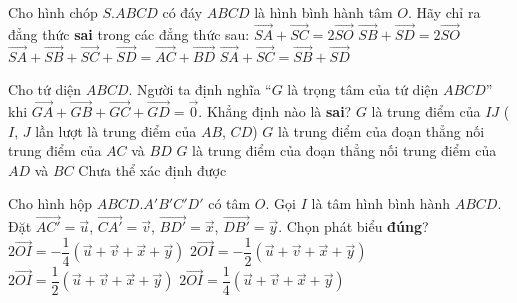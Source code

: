 \begin{ex}%
	Cho hình chóp $S.ABCD$ có đáy $ABCD$ là hình bình hành tâm $O$. Hãy chỉ ra đẳng thức \textbf{sai} trong các đẳng thức sau:
	\choice
	{$\vec{SA}+\vec{SC}=2\vec{SO}$}
	{$\vec{SB}+\vec{SD}=2\vec{SO}$}
	{\True $\vec{SA}+\vec{SB}+\vec{SC}+\vec{SD}=\vec{AC}+\vec{BD}$}
	{$\vec{SA}+\vec{SC}=\vec{SB}+\vec{SD}$}
\end{ex}

\begin{ex}%
	Cho tứ diện $ABCD$. Người ta định nghĩa ``$G$ là trọng tâm của tứ diện $ABCD$'' khi $\vec{GA}+\vec{GB}+\vec{GC}+\vec{GD}=\vec{0}$. Khẳng định nào là \textbf{sai}?
	\choice
	{$G$ là trung điểm của $IJ$ ($I$, $J$ lần lượt là trung điểm của $AB$, $CD$)}
	{$G$ là trung điểm của đoạn thẳng nối trung điểm của $AC$ và $BD$}
	{$G$ là trung điểm của đoạn thẳng nối trung điểm của $AD$ và $BC$}
	{\True Chưa thể xác định được}
\end{ex}

\begin{ex}%
	Cho hình hộp $ABCD.A'B'C'D'$ có tâm $O$. Gọi $I$ là tâm hình bình hành $ABCD$. Đặt $\vec{AC'}=\vec{u}$, $\vec{CA'}=\vec{v}$, $\vec{BD'}=\vec{x}$, $\vec{DB'}=\vec{y}$. Chọn phát biểu \textbf{đúng}?
	\choice
	{$2\vec{OI}=-\dfrac{1}{4}\left(\vec{u}+\vec{v}+\vec{x}+\vec{y}\right)$}
	{$2\vec{OI}=-\dfrac{1}{2}\left(\vec{u}+\vec{v}+\vec{x}+\vec{y}\right)$}
	{$2\vec{OI}=\dfrac{1}{2}\left(\vec{u}+\vec{v}+\vec{x}+\vec{y}\right)$}
	{\True $2\vec{OI}=\dfrac{1}{4}\left(\vec{u}+\vec{v}+\vec{x}+\vec{y}\right)$}
\end{ex}


